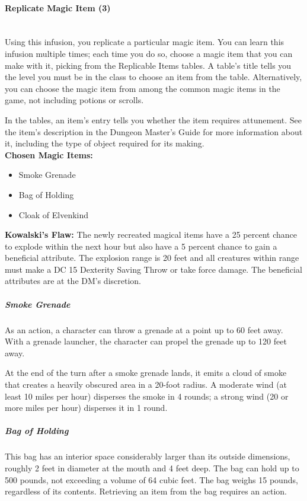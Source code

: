 {\paragraph*{Replicate Magic Item (3)}\hfill\\
Using this infusion, you replicate a particular magic item. You can learn this infusion multiple times; each time you do so, choose a magic item that you can make with it, picking from the Replicable Items tables. A table's title tells you the level you must be in the class to choose an item from the table. Alternatively, you can choose the magic item from among the common magic items in the game, not including potions or scrolls.

In the tables, an item's entry tells you whether the item requires attunement. See the item's description in the Dungeon Master's Guide for more information about it, including the type of object required for its making.\\
\textbf{Chosen Magic Items:}
\begin{itemize}
	\item Smoke Grenade
	\item Bag of Holding
	\item Cloak of Elvenkind
\end{itemize}
\textbf{Kowalski's Flaw:} The newly recreated magical items have a 25 percent chance to explode within the next hour but also have a 5 percent chance to gain a beneficial attribute. The explosion range is 20 feet and all creatures within range must make a DC 15 Dexterity Saving Throw or take  force damage. The beneficial attributes are at the DM's discretion.\\
\subparagraph*{Smoke Grenade}
As an action, a character can throw a grenade at a point up to 60 feet away. With a grenade launcher, the character can propel the grenade up to 120 feet away.

At the end of the turn after a smoke grenade lands, it emits a cloud of smoke that creates a heavily obscured area in a 20-foot radius. A moderate wind (at least 10 miles per hour) disperses the smoke in 4 rounds; a strong wind (20 or more miles per hour) disperses it in 1 round.\\
\subparagraph*{Bag of Holding}
This bag has an interior space considerably larger than its outside dimensions, roughly 2 feet in diameter at the mouth and 4 feet deep. The bag can hold up to 500 pounds, not exceeding a volume of 64 cubic feet. The bag weighs 15 pounds, regardless of its contents. Retrieving an item from the bag requires an action.

}
